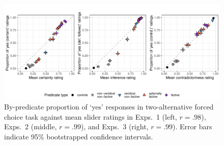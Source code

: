 \documentclass[11pt,fleqn]{article}
\newcommand{\6}{\mbox{$[\hspace*{-.6mm}[$}}
\newcommand{\9}{\mbox{$]\hspace*{-.6mm}]$}}
\begin{document}
\begin{figure}[h!]
\centering
\includegraphics[width=.75\paperwidth]{../../results/compare-diagnostics-and-response-tasks/graphs/joint-comparison-plot}
   
\caption{By-predicate proportion of `yes' responses in two-alternative forced choice task against mean slider ratings in Exps.~1 (left, $r=.98$), Exps.~2 (middle, $r=.99$), and Exps.~3 (right, $r=.99$). Error bars indicate 95\% bootstrapped confidence intervals.}
\label{f-comparison}
\end{figure}
\end{document}
